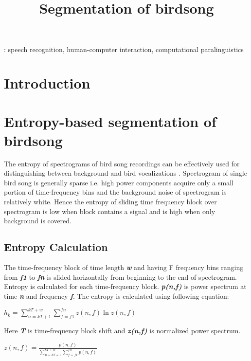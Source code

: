 \documentclass[a4paper]{article}
\title{Segmentation of birdsong}
\begin{document}
  \maketitle
  \begin{abstract}
  \end{abstract}
  : speech recognition, human-computer interaction, computational paralinguistics



  \section{Introduction}

\section{Entropy-based segmentation of birdsong}
The entropy of spectrograms of bird song recordings can be effectively used for distinguishing between background and bird vocalizations \cite{6625329}. Spectrogram of single bird song is generally sparse i.e. high power components acquire only a small portion of time-frequency bins and the background noise of spectrogram is relatively white. Hence  the entropy of sliding time frequency block over spectrogram is low when block contains a signal and is high when only background is covered. 
\subsection{Entropy Calculation}
The time-frequency block of time length \textbf{\textit{w}} and having F frequency bins ranging from \textbf{\textit{f1}} to  \textbf{\textit{fn}} is slided horizontally from beginning to the end of spectrogram. Entropy is calculated for each time-frequency block. \textbf{\textit{p(n,f)}} is power spectrum at time \textbf{\textit{n}} and frequency  \textbf{\textit{f}}.  The entropy is calculated using following equation:

\hspace{1cm}
  $h_{k}=\sum_{n=kT+1}^{kT+w}\sum_{f=f1}^{fn}z(n,f) \ln z(n,f)$

 \hspace{1cm}
 
Here \textbf{\textit{T}} is time-frequency block shift and \textbf{\textit{z(n,f)}} is normalized power spectrum.


\hspace{1cm}
$z(n,f)=\frac {p(n,f)}
{\sum_{n=kT+1}^{kT+w}\sum_{f=f1}^{fn} p(n,f)}$
\end{document}
